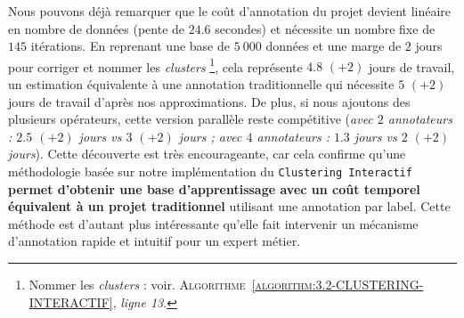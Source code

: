 			Nous pouvons déjà remarquer que le coût d'annotation du projet devient linéaire en nombre de données (pente de $24.6$ secondes) et nécessite un nombre fixe de $145$ itérations.
			En reprenant une base de $5~000$ données et une marge de $2$ jours pour corriger et nommer les \textit{clusters} \footnote{
				Nommer les \textit{clusters} : voir. \textsc{Algorithme~\ref{algorithm:3.2-CLUSTERING-INTERACTIF}}, \textit{ligne 13}.
			}, cela représente $4.8$ {\footnotesize $(+2)$} jours de travail, un estimation équivalente à une annotation traditionnelle qui nécessite $5 $ {\footnotesize $(+2)$} jours de travail d'après nos approximations.
			De plus, si nous ajoutons des plusieurs opérateurs, cette version parallèle reste compétitive (\textit{avec $2$ annotateurs : $2.5$ {\footnotesize $(+2)$} jours vs $3$ {\footnotesize $(+2)$} jours ; avec $4$ annotateurs : $1.3$ jours vs $2$ {\footnotesize $(+2)$} jours}).
			Cette découverte est très encourageante, car cela confirme qu'une méthodologie basée sur notre implémentation du \texttt{Clustering Interactif} \textbf{permet d'obtenir une base d'apprentissage avec un coût temporel équivalent à un projet traditionnel} utilisant une annotation par label.
			Cette méthode est d'autant plus intéressante qu'elle fait intervenir un mécanisme d'annotation rapide et intuitif pour un expert métier.
			
